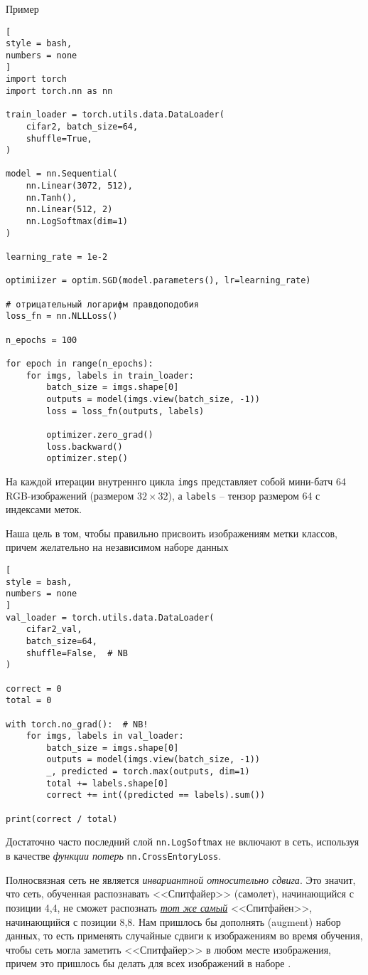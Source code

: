\documentclass[%
	11pt,
	a4paper,
	utf8,
		]{article}
\begin{document}
Пример
\begin{lstlisting}[
style = bash,
numbers = none
]
import torch
import torch.nn as nn

train_loader = torch.utils.data.DataLoader(
    cifar2, batch_size=64,
    shuffle=True,
)

model = nn.Sequential(
    nn.Linear(3072, 512),
    nn.Tanh(),
    nn.Linear(512, 2)
    nn.LogSoftmax(dim=1)
)

learning_rate = 1e-2

optimiizer = optim.SGD(model.parameters(), lr=learning_rate)

# отрицательный логарифм правдоподобия
loss_fn = nn.NLLLoss()

n_epochs = 100

for epoch in range(n_epochs):
    for imgs, labels in train_loader:
        batch_size = imgs.shape[0]
        outputs = model(imgs.view(batch_size, -1))
        loss = loss_fn(outputs, labels)
        
        optimizer.zero_grad()
        loss.backward()
        optimizer.step()
\end{lstlisting}

На каждой итерации внутреннго цикла \verb|imgs| представляет собой мини-батч 64 RGB-изображений (размером $32 \times 32$), а \verb|labels| -- тензор размером 64 с индексами меток.

Наша цель в том, чтобы правильно присвоить изображениям метки классов, причем желательно на независимом наборе данных
\begin{lstlisting}[
style = bash,
numbers = none
]
val_loader = torch.utils.data.DataLoader(
    cifar2_val,
    batch_size=64,
    shuffle=False,  # NB
)

correct = 0
total = 0

with torch.no_grad():  # NB!
    for imgs, labels in val_loader:
        batch_size = imgs.shape[0]
        outputs = model(imgs.view(batch_size, -1))
        _, predicted = torch.max(outputs, dim=1)
        total += labels.shape[0]
        correct += int((predicted == labels).sum())

print(correct / total)
\end{lstlisting}

Достаточно часто последний слой \verb|nn.LogSoftmax| не включают в сеть, используя в качестве \emph{функции потерь} \verb|nn.CrossEntoryLoss|.

Полносвязная сеть не является \emph{инвариантной относительно сдвига}. Это значит, что сеть, обученная распознавать <<Спитфайер>> (самолет), начинающийся с позиции 4,4, не сможет распознать \underline{\itshape тот же самый} <<Спитфайен>>, начинающийся с позиции 8,8. Нам пришлось бы дополнять (augment) набор данных, то есть применять случайные сдвиги к изображениям во время обучения, чтобы сеть могла заметить <<Спитфайер>> в любом месте изображения, причем это пришлось бы делать для всех изображений в наборе \cite[]{pytorch-2022}.
\end{document}
